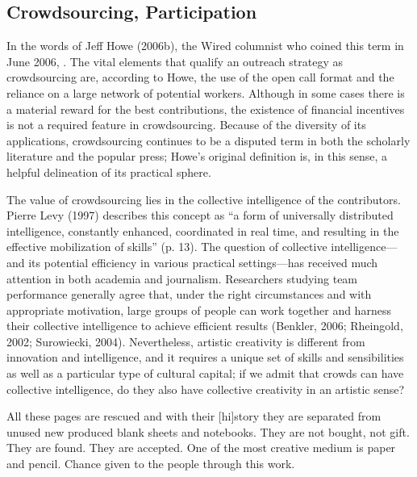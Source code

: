 \subsection{Crowdsourcing, Participation}
In the words of Jeff Howe (2006b), the Wired columnist who coined this term in June 2006, . The vital elements that qualify an outreach strategy as crowdsourcing are, according to Howe, the use of the open call format and the reliance on a large network of potential workers. Although in some cases there is a material reward for the best contributions, the existence of financial incentives is not a required feature in crowdsourcing. Because of the diversity of its applications, crowdsourcing continues to be a disputed term in both the scholarly literature and the popular press; Howe’s original definition is, in this sense, a helpful delineation of its practical sphere.

The value of crowdsourcing lies in the collective intelligence of the contributors. Pierre Levy (1997) describes this concept as “a form of universally distributed intelligence, constantly enhanced, coordinated in real time, and resulting in the effective mobilization of skills” (p. 13). The question of collective intelligence—and its potential efficiency in various practical settings—has received much attention in both academia and journalism. Researchers studying team performance generally agree that, under the right circumstances and with appropriate motivation, large groups of people can work together and harness their collective intelligence to achieve efficient results (Benkler, 2006; Rheingold, 2002; Surowiecki, 2004). Nevertheless, artistic creativity is different from innovation and intelligence, and it requires a unique set of skills and sensibilities as well as a particular type of cultural capital; if we admit that crowds can have collective intelligence, do they also have collective creativity in an artistic sense?

All these pages are rescued and with their [hi]story they are separated from unused new produced blank sheets and notebooks. They are not bought, not gift. They are found. They are accepted. One of the most creative medium is paper and pencil. Chance given to the people through this work.

